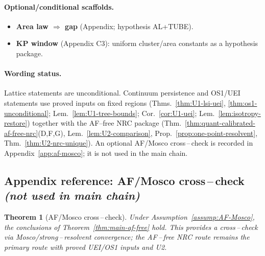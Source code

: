 \documentclass[11pt]{amsart}
\theoremstyle{plain}
\newtheorem{theorem}{Theorem}[section]
\theoremstyle{definition}
\theoremstyle{remark}
\begin{document}
\paragraph{Optional/conditional scaffolds.}
\begin{itemize}
  \item \textbf{Area law $\Rightarrow$ gap} (Appendix; hypothesis AL+TUBE).
  \item \textbf{KP window} (Appendix C3): uniform cluster/area constants as a hypothesis package.
\end{itemize}
\paragraph{Wording status.}
Lattice statements are unconditional. Continuum persistence and OS1/UEI statements use proved inputs on fixed regions (Thms.~\ref{thm:U1-lsi-uei}, \ref{thm:os1-unconditional}; Lem.~\ref{lem:U1-tree-bounds}; Cor.~\ref{cor:U1-uei}; Lem.~\ref{lem:isotropy-restore}) together with the AF--free NRC package (Thm.~\ref{thm:quant-calibrated-af-free-nrc}(D,F,G), Lem.~\ref{lem:U2-comparison}, Prop.~\ref{prop:one-point-resolvent}, Thm.~\ref{thm:U2-nrc-unique}). An optional AF/Mosco cross\,–\,check is recorded in Appendix~\ref{app:af-mosco}; it is not used in the main chain.

\subsection*{Appendix reference: AF/Mosco cross\,–\,check \emph{(not used in main chain)}}\label{app:af-mosco}
\begin{theorem}[AF/Mosco cross\,–\,check]\label{thm:af-mosco-crosscheck}
Under Assumption~\ref{assump:AF-Mosco}, the conclusions of Theorem~\ref{thm:main-af-free} hold. This provides a cross\,–\,check via Mosco/strong\,–\,resolvent convergence; the AF\,–\,free NRC route remains the primary route with proved UEI/OS1 inputs and U2.
\end{theorem}
\end{document}

